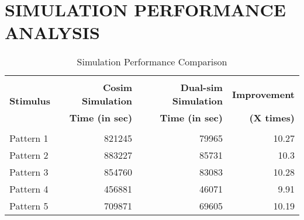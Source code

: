 \section{SIMULATION PERFORMANCE ANALYSIS}
\begin{table}[h!]
\begin{center}
\label{tab:Simulation Performance}
\vspace{0.2cm}
\begin{tabular}{|l|r|r|r|}
\hline
\multirow{3}{*}{\bf Stimulus} & &	&\\ & {\bf Cosim Simulation} 	& {\bf Dual-sim Simulation} & {\bf Improvement } 	\\ & {\bf Time (in sec)}  &  {\bf Time (in sec)} &  {\bf(X times) }\\



						&				&				&				\\
\hline
Pattern 1 			&821245				&79965				&10.27 				\\
Pattern 2  				&883227				&85731				&10.3 				\\

Pattern 3  		&854760				&83083				&10.28				\\

Pattern 4  			&456881				&46071 				&9.91				\\

Pattern 5  				&709871				&69605				&10.19				\\
\hline


\end{tabular}
\end{center}
\caption{Simulation Performance Comparison}

\end{table}



